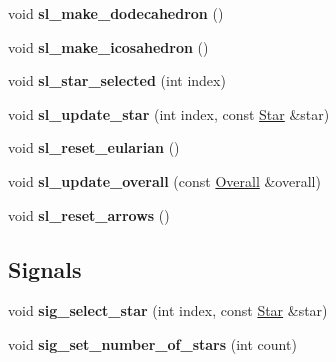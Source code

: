 \begin{DoxyCompactItemize}
void {\bfseries sl\+\_\+make\+\_\+dodecahedron} ()
\item 
\mbox{\label{classmgs_1_1StarFieldGUI_a258451580088c6db0382c3e5d52fa732}} 
void {\bfseries sl\+\_\+make\+\_\+icosahedron} ()
\item 
\mbox{\label{classmgs_1_1StarFieldGUI_a439a310ee60d4734dd0f5b113fa63656}} 
void {\bfseries sl\+\_\+star\+\_\+selected} (int index)
\item 
\mbox{\label{classmgs_1_1StarFieldGUI_a08ae7d43df6daa06e6db3f134bd5ea13}} 
void {\bfseries sl\+\_\+update\+\_\+star} (int index, const \hyperlink{structmgs_1_1Star}{Star} \&star)
\item 
\mbox{\label{classmgs_1_1StarFieldGUI_a99b26bf62f836fcf8c3554e43a66bf6f}} 
void {\bfseries sl\+\_\+reset\+\_\+eularian} ()
\item 
\mbox{\label{classmgs_1_1StarFieldGUI_a7134d966b6b9e8e0e7b671e6c56c17a3}} 
void {\bfseries sl\+\_\+update\+\_\+overall} (const \hyperlink{structmgs_1_1FieldParmsSimulation}{Overall} \&overall)
\item 
\mbox{\label{classmgs_1_1StarFieldGUI_a06c48d969b008f9088c25c2c1b442478}} 
void {\bfseries sl\+\_\+reset\+\_\+arrows} ()
\end{DoxyCompactItemize}
\subsection*{Signals}
\begin{DoxyCompactItemize}
\item 
\mbox{\label{classmgs_1_1StarFieldGUI_af7cc763f4f774ca0d98560ff99a876be}} 
void {\bfseries sig\+\_\+select\+\_\+star} (int index, const \hyperlink{structmgs_1_1Star}{Star} \&star)
\item 
\mbox{\label{classmgs_1_1StarFieldGUI_a5b5a5e8023782dff27bccbb170cb0473}} 
void {\bfseries sig\+\_\+set\+\_\+number\+\_\+of\+\_\+stars} (int count)
\end{DoxyCompactItemize}
